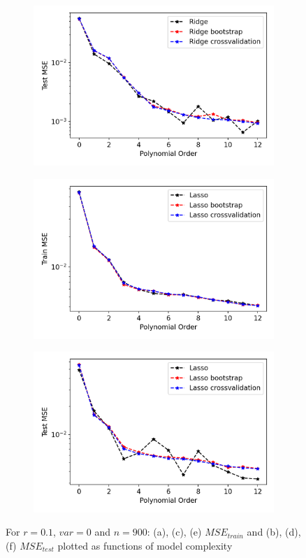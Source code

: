 \begin{figure}[ht]
\begin{subfigure}{.5\textwidth}
  \caption{}
  \label{fig:ridge9}
\end{subfigure}%
\begin{subfigure}{.5\textwidth}
  \centering
  \includegraphics[width=.8\linewidth]{Images/ridge8.png}
  \caption{}
  \label{fig:ridge8}
\end{subfigure}
\begin{subfigure}{.5\textwidth}
  \centering
  \includegraphics[width=.8\linewidth]{Images/lasso9.png}
  \caption{}
  \label{fig:lasso9}
\end{subfigure}%
\begin{subfigure}{.5\textwidth}
  \centering
  \includegraphics[width=.8\linewidth]{Images/lasso8.png}
  \caption{}
  \label{fig:lasso8}
\end{subfigure}
\caption{For $r=0.1$, $var=0$ and $n=900$: (a), (c), (e) $MSE_{train}$ and  (b), (d), (f) $MSE_{test}$ plotted as functions of model complexity}
\label{fig:OLS_resample}
\end{figure}



